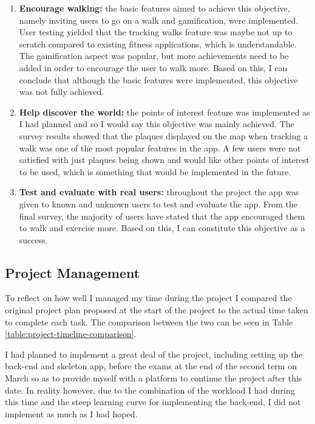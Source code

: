 \begin{enumerate}[label=\textbf{Obj \arabic*}]
  \item \textbf{Encourage walking:} the basic features aimed to achieve this objective, namely inviting users to go on a walk and gamification, were implemented. User testing yielded that the tracking walks feature was maybe not up to scratch compared to existing fitness applications, which is understandable. The gamification aspect was popular, but more achievements need to be added in order to encourage the user to walk more. Based on this, I can conclude that although the basic features were implemented, this objective was not fully achieved.

  \item \textbf{Help discover the world:} the points of interest feature was implemented as I had planned and so I would say this objective was mainly achieved. The survey results showed that the plaques displayed on the map when tracking a walk was one of the most popular features in the app. A few users were not satisfied with just plaques being shown and would like other points of interest to be used, which is something that would be implemented in the future.

  \item \textbf{Test and evaluate with real users:} throughout the project the app was given to known and unknown users to test and evaluate the app. From the final survey, the majority of users have stated that the app encouraged them to walk and exercise more. Based on this, I can constitute this objective as a success.
\end{enumerate}

\subsection{Project Management}


To reflect on how well I managed my time during the project I compared the original project plan proposed at the start of the project to the actual time taken to complete each task. The comparison between the two can be seen in Table \ref{table:project-timeline-comparison}.

I had planned to implement a great deal of the project, including setting up the back-end and skeleton app, before the exams at the end of the second term on  March so as to provide myself with a platform to continue the project after this date. In reality however, due to the combination of the workload I had during this time and the steep learning curve for implementing the back-end, I did not implement as much as I had hoped.

